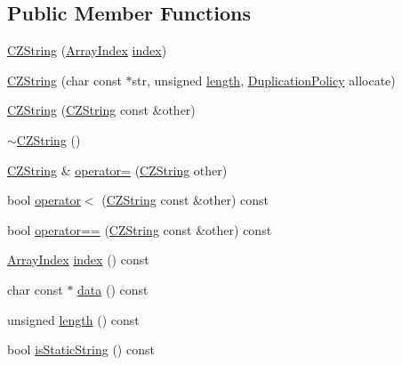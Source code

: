 \subsection*{Public Member Functions}
\begin{DoxyCompactItemize}
\item 
\hyperlink{classJson_1_1Value_1_1CZString_a4b8aa6eaabdec78cffec96e088da996f}{C\+Z\+String} (\hyperlink{classJson_1_1Value_a184a91566cccca7b819240f0d5561c7d}{Array\+Index} \hyperlink{classJson_1_1Value_1_1CZString_a4e9f305dbc4a4700abd955fde673a01c}{index})
\item 
\hyperlink{classJson_1_1Value_1_1CZString_a86a86eaf0cf26d4c861d0daa359d608a}{C\+Z\+String} (char const $\ast$str, unsigned \hyperlink{classJson_1_1Value_1_1CZString_a4e697840c41fb56756be7a75efa114cb}{length}, \hyperlink{classJson_1_1Value_1_1CZString_a2805c46fb4a72bbaed55de6d75941b6d}{Duplication\+Policy} allocate)
\item 
\hyperlink{classJson_1_1Value_1_1CZString_a9685070d440335b55ef5c85747d25157}{C\+Z\+String} (\hyperlink{classJson_1_1Value_1_1CZString}{C\+Z\+String} const \&other)
\item 
\hyperlink{classJson_1_1Value_1_1CZString_add6989dc7073646b95e5ebacb3f07d51}{$\sim$\+C\+Z\+String} ()
\item 
\hyperlink{classJson_1_1Value_1_1CZString}{C\+Z\+String} \& \hyperlink{classJson_1_1Value_1_1CZString_a6513ff431b0593d5744868dfee739f7b}{operator=} (\hyperlink{classJson_1_1Value_1_1CZString}{C\+Z\+String} other)
\item 
bool \hyperlink{classJson_1_1Value_1_1CZString_a5e88edf9f7443c77d6b70e409a0b5983}{operator$<$} (\hyperlink{classJson_1_1Value_1_1CZString}{C\+Z\+String} const \&other) const 
\item 
bool \hyperlink{classJson_1_1Value_1_1CZString_af7a3b51ccf1bb205210c6b9a570093bc}{operator==} (\hyperlink{classJson_1_1Value_1_1CZString}{C\+Z\+String} const \&other) const 
\item 
\hyperlink{classJson_1_1Value_a184a91566cccca7b819240f0d5561c7d}{Array\+Index} \hyperlink{classJson_1_1Value_1_1CZString_a4e9f305dbc4a4700abd955fde673a01c}{index} () const 
\item 
char const $\ast$ \hyperlink{classJson_1_1Value_1_1CZString_a02482793b88b1062c4a0dd0a53f3d2a7}{data} () const 
\item 
unsigned \hyperlink{classJson_1_1Value_1_1CZString_a4e697840c41fb56756be7a75efa114cb}{length} () const 
\item 
bool \hyperlink{classJson_1_1Value_1_1CZString_af3cc02b77c2cd79d4646fcea3575c1fd}{is\+Static\+String} () const 
\end{DoxyCompactItemize}
